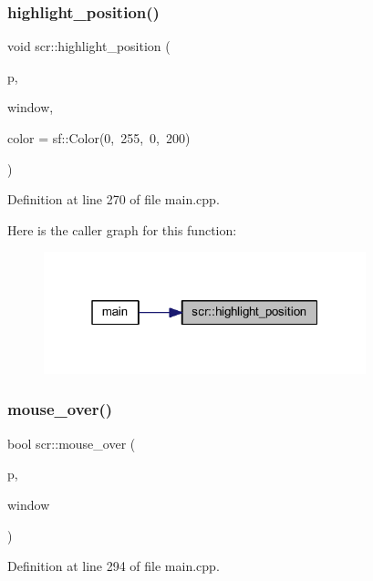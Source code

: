 \subsubsection{\texorpdfstring{highlight\_position()}{highlight\_position()}}
{\footnotesize\ttfamily void scr\+::highlight\+\_\+position (\begin{DoxyParamCaption}\item[{const \mbox{\hyperlink{class_coordinates}{Coordinates}} \&}]{p,  }\item[{sf\+::\+Render\+Window \&}]{window,  }\item[{sf\+::\+Color}]{color = {\ttfamily sf\+:\+:Color(0,~255,~0,~200)} }\end{DoxyParamCaption})}



Definition at line 270 of file main.\+cpp.

Here is the caller graph for this function\+:
\nopagebreak
\begin{figure}[H]
\begin{center}
\leavevmode
\includegraphics[width=265pt]{namespacescr_afbf344f09162239b14701105f01e1671_icgraph}
\end{center}
\end{figure}
\mbox{\label{namespacescr_a10f589a004aed2b681476e3cf0c02bfb}} 
\subsubsection{\texorpdfstring{mouse\_over()}{mouse\_over()}}
{\footnotesize\ttfamily bool scr\+::mouse\+\_\+over (\begin{DoxyParamCaption}\item[{\mbox{\hyperlink{class_piece}{Piece}} $\ast$}]{p,  }\item[{sf\+::\+Render\+Window \&}]{window }\end{DoxyParamCaption})}



Definition at line 294 of file main.\+cpp.

